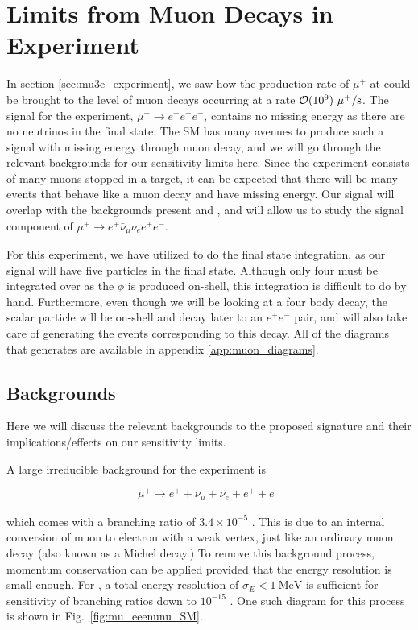 \section{Limits from Muon Decays in \mueee Experiment}
In section \ref{sec:mu3e_experiment}, we saw how the production rate of $\mu^+$ at \mueee could be brought to the level of muon decays occurring at a rate $\operatorname{\mathcal{O}}(10^9)~\mu^+/\textrm{s}$.
The signal for the \mueee experiment, $\mu^+ \rightarrow e^+ e^+ e^-$, contains no missing energy as there are no neutrinos in the final state.
The SM has many avenues to produce such a signal with missing energy through muon decay, and we will go through the relevant backgrounds for our sensitivity limits here.
Since the experiment consists of many muons stopped in a target, it can be expected that there will be many events that behave like a muon decay and have missing energy.
Our signal will overlap with the backgrounds present and \mueee, and will allow us to study the signal component of $\mu^+ \rightarrow e^+ \bar{\nu}_\mu \nu_e e^+ e^-$.

For this experiment, we have utilized \madgraph to do the final state integration, as our signal will have five particles in the final state.
Although only four must be integrated over as the $\phi$ is produced on-shell, this integration is difficult to do by hand.
Furthermore, even though we will be looking at a four body decay, the scalar particle will be on-shell and decay later to an $e^+ e^-$ pair, and \madgraph will also take care of generating the events corresponding to this decay.
All of the diagrams that \madgraph generates are available in appendix \ref{app:muon_diagrams}.

\subsection{Backgrounds}
Here we will discuss the relevant backgrounds to the proposed signature and their implications/effects on our sensitivity limits.

A large irreducible background for the experiment is

\begin{equation}
    \mu^+ \rightarrow e^+ + \bar{\nu}_\mu + \nu_e + e^+ + e^-
\end{equation}

\noindent which comes with a branching ratio of $3.4 \times 10^{-5}$ \cite{Agashe:2014kda}. 
This is due to an internal conversion of muon to electron with a weak vertex, just like an ordinary muon decay (also known as a Michel decay.)
To remove this background process, momentum conservation can be applied provided that the energy resolution is small enough.
For \mueee, a total energy resolution of $\sigma_E < 1~\textrm{MeV}$ is sufficient for sensitivity of branching ratios down to $10^{-15}$ \cite{Blondel:2013ia}.
One such diagram for this process is shown in Fig.\ \ref{fig:mu_eeenunu_SM}.

